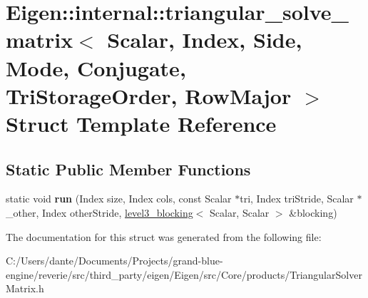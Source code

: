 \hypertarget{struct_eigen_1_1internal_1_1triangular__solve__matrix_3_01_scalar_00_01_index_00_01_side_00_01_m9c5e3cf61677ffd5b871aafbe3527bae}{}\section{Eigen\+::internal\+::triangular\+\_\+solve\+\_\+matrix$<$ Scalar, Index, Side, Mode, Conjugate, Tri\+Storage\+Order, Row\+Major $>$ Struct Template Reference}
\label{struct_eigen_1_1internal_1_1triangular__solve__matrix_3_01_scalar_00_01_index_00_01_side_00_01_m9c5e3cf61677ffd5b871aafbe3527bae}
\subsection*{Static Public Member Functions}
\begin{DoxyCompactItemize}
\item 
\mbox{\label{struct_eigen_1_1internal_1_1triangular__solve__matrix_3_01_scalar_00_01_index_00_01_side_00_01_m9c5e3cf61677ffd5b871aafbe3527bae_a0f3266b4b26c45da286cf8b5cfab4d56}} 
static void {\bfseries run} (Index size, Index cols, const Scalar $\ast$tri, Index tri\+Stride, Scalar $\ast$\+\_\+other, Index other\+Stride, \mbox{\hyperlink{class_eigen_1_1internal_1_1level3__blocking}{level3\+\_\+blocking}}$<$ Scalar, Scalar $>$ \&blocking)
\end{DoxyCompactItemize}


The documentation for this struct was generated from the following file\+:\begin{DoxyCompactItemize}
\item 
C\+:/\+Users/dante/\+Documents/\+Projects/grand-\/blue-\/engine/reverie/src/third\+\_\+party/eigen/\+Eigen/src/\+Core/products/Triangular\+Solver\+Matrix.\+h\end{DoxyCompactItemize}
